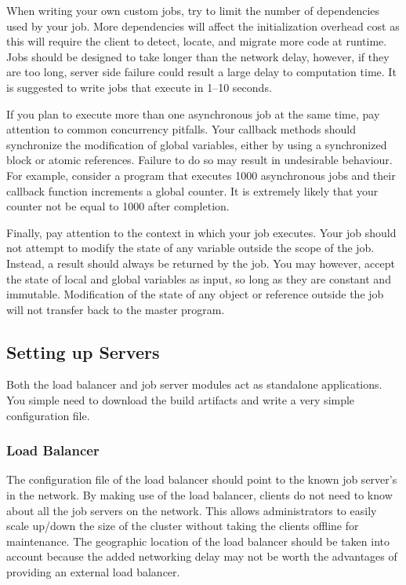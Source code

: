 When writing your own custom jobs, try to limit the number of
dependencies used by your job.
More dependencies will affect the initialization overhead cost
as this will require the client to detect, locate, and migrate
more code at runtime.
Jobs should be designed to take longer than the network
delay, however, if they are too long, server side failure
could result a large delay to computation time.
It is suggested to write jobs that execute in 1--10 seconds.

If you plan to execute more than one asynchronous job at the
same time, pay attention to common concurrency pitfalls.
Your callback methods should synchronize the modification
of global variables, either by using a synchronized block or
atomic references.
Failure to do so may result in undesirable behaviour.
For example, consider a program that executes 1000 asynchronous
jobs and their callback function increments a global counter.
It is extremely likely that your counter not be equal to 1000
after completion.

Finally, pay attention to the context in which your job executes.
Your job should not attempt to modify the state of any variable
outside the scope of the job.
Instead, a result should always be returned by the job.
You may however, accept the state of local and global variables
as input, so long as they are constant and immutable.
Modification of the state of any object or reference outside the job
will not transfer back to the master program.

\subsection{Setting up Servers}\label{subsec:settingUpServers}

Both the load balancer and job server modules act as standalone
applications.
You simple need to download the build artifacts and write
a very simple configuration file.


\subsubsection{Load Balancer}

The configuration file of the load balancer should point
to the known job server's in the network.
By making use of the load balancer, clients do not
need to know about all the job servers on the network.
This allows administrators to easily scale up/down the
size of the cluster without taking the clients offline for
maintenance.
The geographic location of the load balancer should
be taken into account because the added networking delay
may not be worth the advantages of providing an external
load balancer.

